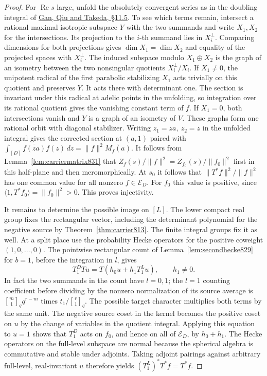 \documentclass[a4paper,11pt]{article}
\theoremstyle{definition}
\theoremstyle{remark}
\numberwithin{equation}{section}
\begin{document}
\begin{proof}
For \(\operatorname{Re}s\) large, unfold the absolutely
convergent series as in the doubling integral of
\href{https://arxiv.org/pdf/1207.4709}{Gan, Qiu and Takeda,
\S11.5}. To see which terms remain, intersect a rational
maximal isotropic subspace \(Y\) with the two summands and
write \(X_1,X_2\) for the intersections. Its projection to
the \(i\)-th summand lies in \(X_i^\perp\). Comparing
dimensions for both projections gives
\(\dim X_1=\dim X_2\) and equality of the projected spaces
with \(X_i^\perp\). The induced subspace modulo
\(X_1\oplus X_2\) is the graph of an isometry between the
two nonsingular quotients \(X_i^\perp/X_i\). If \(X_1\ne0\),
the unipotent radical of the first parabolic stabilizing
\(X_1\) acts trivially on this quotient and preserves \(Y\).
It acts there with determinant one. The section is invariant
under this radical at adelic points in the unfolding, so
integration over its rational quotient gives the vanishing
constant term of \(\bar f\). If \(X_1=0\), both intersections
vanish and \(Y\) is a graph of an isometry of \(V\). These
graphs form one rational orbit with diagonal stabilizer.
Writing \(z_1=za,\ z_2=z\) in the unfolded integral gives
the corrected section at \((a,1)\) paired with
\(\int_{[D]}\overline{f(za)}f(z)\,dz=\|f\|^2\overline{M_f(a)}\).
It follows from Lemma~\ref{lem:carriermatrix831} that
\(Z_f(s)/\|f\|^2=Z_{f_0}(s)/\|f_0\|^2\) first in this
half-plane and then meromorphically. At \(s_0\) it follows
that \(\|T^*f\|^2/\|f\|^2\) has one common value for all
nonzero \(f\in\mathcal E_D\). For \(f_0\) this value is
positive, since \(\langle 1,T^*f_0\rangle=\|f_0\|^2>0\).
This proves injectivity.

It remains to determine the possible image on \([L]\). The
lower compact real group fixes the rectangular vector,
including the determinant polynomial for the negative source
by Theorem~\ref{thm:carrier813}. The finite integral groups
fix it as well. At a split place use the probability Hecke
operators for the positive coweight \((1,0,\ldots,0)\).
The pointwise rectangular count of Lemma~\ref{lem:secondhecke829}
for \(b=1\), before the integration in \(l\), gives
\[
             T_1^D T u=T(h_0u+h_1T_1^L u),\qquad h_1\ne0 .
\]
In fact the two summands in the count have \(l=0,1\);
the \(l=1\) counting coefficient before dividing by the
nonzero normalization of its source average is
\({m\brack1}_q q^{r-m}\) times \(t_1/{r\brack1}_q\).
The possible target character multiplies both terms by the
same unit. The negative source coset in the kernel becomes
the positive coset on \(u\) by the change of variables in
the quotient integral. Applying this equation to \(u=1\)
shows that \(T_1^D\) acts on \(f_0\), and hence on all of
\(\mathcal E_D\), by \(h_0+h_1\). The Hecke operators on
the full-level subspace are normal because the spherical
algebra is commutative and stable under adjoints. Taking
adjoint pairings against arbitrary full-level, real-invariant
\(u\) therefore yields
\((T_1^L)^*T^*f=T^*f\).


\end{proof}
\end{document}
